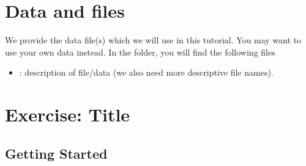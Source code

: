 \section{Data and files}

We provide the data file(s) which we will use in this tutorial.
You may want to use your own data instead.
In the  folder, you will find the following files
\begin{itemize}
\item {}: description of file/data (we also need more descriptive file names).
\end{itemize}



\section{Exercise: Title}\label{sect:RB-ExerciseMain}

\bigskip
\subsection{Getting Started}\label{subsect:RB-GetStart}


%
%

